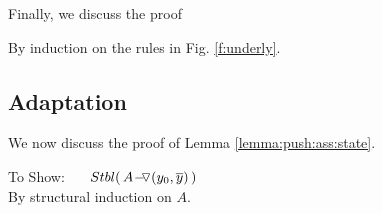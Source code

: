 \vspace{1cm} Finally, we discuss the proof


\newcommand{\SP}{$\strut \ \ \ \ $}

By induction on the rules in Fig. \ref{f:underly}.

\completeProof 

\subsection{Adaptation}
\label{appendix:adaptation}
 
 
 We now discuss the proof of Lemma \ref{lemma:push:ass:state}.

 \vspace{0.5cm}
 
$~$ \\
To Show: \ \ \  $\Stable{\,  \PushASLong {(y_0,\overline y)} A\, }$
\\
By structural induction on $A$.\\
\completeProofSub

\vspace{1cm}

